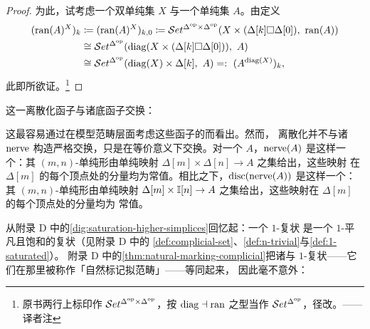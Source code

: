 \begin{proof}
为此，试考虑一个双单纯集 $X$ 与一个单纯集 $A$。由定义
\[
\begin{aligned}
(\rvRan(A)^{X})_{k}
&\coloneqq(\rvRan(A)^{X})_{k,0}
 \coloneqq\Set^{\Delta^{\mathrm{op}}\times\Delta^{\mathrm{op}}}
 (X\times(\Delta[k]\square\Delta[0]),\ \rvRan(A))\\
&\cong\Set^{\Delta^{\mathrm{op}}}(\rvDiag(X\times(\Delta[k]\square\Delta[0])),\ A)\\
&\cong\Set^{\Delta^{\mathrm{op}}}(\rvDiag(X)\times\Delta[k],\ A)
 =:\ (A^{\rvDiag(X)})_{k},
\end{aligned}
\]
此即所欲证。\footnote{原书两行上标印作
$\mathcal{S}et^{\Delta^{\mathrm{op}}\times\Delta^{\mathrm{op}}}$，按
$\mathrm{diag}\dashv\mathrm{ran}$ 之型当作 $\mathcal{S}et^{\Delta^{\mathrm{op}}}$，径改。——译者注}
\end{proof}

\begin{remark}\label{rem:disc-commutes}
这一离散化函子与诸底\trQuasiCategory{}函子交换：
\begin{center}
\end{center}
这最容易通过在模型范畴层面考虑这些函子的\trLeftAdjoint{}而看出。然而，
离散化并不与诸 $\mathrm{nerve}$ 构造严格交换，只是在等价意义下交换。对一个%
\trQuasiCategory{} $A$，$\mathrm{nerve}(A)$ 是这样一个\trSegalCategories：其
$(m,n)$-单纯形由单纯映射 $\Delta[m]\times\Delta[n]\to A$ 之集给出，这些映射
在 $\Delta[m]$ 的每个顶点处的分量均为常值。相比之下，$\mathrm{disc}(\mathrm{nerve}(A))$
是这样一个\trSegalCategories：其 $(m,n)$-单纯形由单纯映射 $\Delta[m]\times\mathbb{I}[n]\to A$ 之集给出，这些映射在 $\Delta[m]$ 的每个顶点处的分量均为
常值。
\end{remark}

从附录 D 中的\cref{dig:saturation-higher-simplices}回忆起：一个 $1$-复状%
\trSimplicialSet{}是一个 $1$-平凡且饱和的复状\trSimplicialSet（见附录 D 中的
\cref{def:complicial-set}、\cref{def:n-trivial}与\cref{def:1-saturated}）。
附录 D 中的\cref{thm:natural-marking-complicial}把诸\trQuasiCategory{}与
$1$-复状\trSimplicialSet——它们在那里被称作「自然标记拟范畴」——等同起来，
因此毫不意外：

